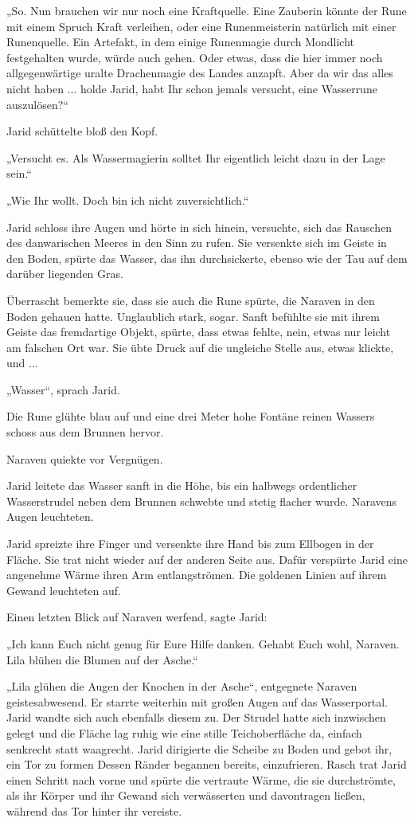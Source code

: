 „So. Nun brauchen wir nur noch eine Kraftquelle. Eine Zauberin könnte der Rune mit einem Spruch Kraft verleihen, oder eine Runenmeisterin natürlich mit einer Runenquelle. Ein Artefakt, in dem einige Runenmagie durch Mondlicht festgehalten wurde, würde auch gehen. Oder etwas, dass die hier immer noch allgegenwärtige uralte Drachenmagie des Landes anzapft. Aber da wir das alles nicht haben ... holde Jarid, habt Ihr schon jemals versucht, eine Wasserrune auszulösen?“

Jarid schüttelte bloß den Kopf.

„Versucht es. Als Wassermagierin solltet Ihr eigentlich leicht dazu in der Lage sein.“

„Wie Ihr wollt. Doch bin ich nicht zuversichtlich.“

Jarid schloss ihre Augen und hörte in sich hinein, versuchte, sich das Rauschen des danwarischen Meeres in den Sinn zu rufen. Sie versenkte sich im Geiste in den Boden, spürte das Wasser, das ihn durchsickerte, ebenso wie der Tau auf dem darüber liegenden Gras.

Überrascht bemerkte sie, dass sie auch die Rune spürte, die Naraven in den Boden gehauen hatte. Unglaublich stark, sogar. Sanft befühlte sie mit ihrem Geiste das fremdartige Objekt, spürte, dass etwas fehlte, nein, etwas nur leicht am falschen Ort war. Sie übte Druck auf die ungleiche Stelle aus, etwas klickte, und ...

„Wasser“, sprach Jarid.

Die Rune glühte blau auf und eine drei Meter hohe Fontäne reinen Wassers schoss aus dem Brunnen hervor.

Naraven quiekte vor Vergnügen.

Jarid leitete das Wasser sanft in die Höhe, bis ein halbwegs ordentlicher Wasserstrudel neben dem Brunnen schwebte und stetig flacher wurde. Naravens Augen leuchteten.

Jarid spreizte ihre Finger und versenkte ihre Hand bis zum Ellbogen in der Fläche. Sie trat nicht wieder auf der anderen Seite aus. Dafür verspürte Jarid eine angenehme Wärme ihren Arm entlangströmen. Die goldenen Linien auf ihrem Gewand leuchteten auf.

Einen letzten Blick auf Naraven werfend, sagte Jarid:

„Ich kann Euch nicht genug für Eure Hilfe danken. Gehabt Euch wohl, Naraven. Lila blühen die Blumen auf der Asche.“

„Lila glühen die Augen der Knochen in der Asche“, entgegnete Naraven geistesabwesend. Er starrte weiterhin mit großen Augen auf das Wasserportal. Jarid wandte sich auch ebenfalls diesem zu. Der Strudel hatte sich inzwischen gelegt und die Fläche lag ruhig wie eine stille Teichoberfläche da, einfach senkrecht statt waagrecht. Jarid dirigierte die Scheibe zu Boden und gebot ihr, ein Tor zu formen Dessen Ränder begannen bereits, einzufrieren. Rasch trat Jarid einen Schritt nach vorne und spürte die vertraute Wärme, die sie durchströmte, als ihr Körper und ihr Gewand sich verwässerten und davontragen ließen, während das Tor hinter ihr vereiste.

